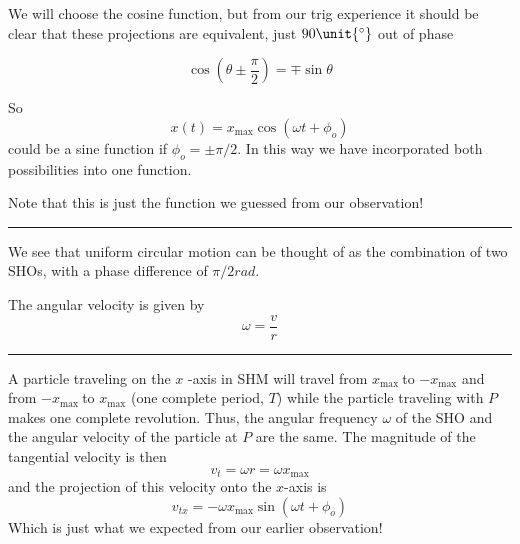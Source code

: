 \documentclass{book}
\begin{document}
We will choose the cosine function, but from our trig experience it should
be clear that these projections are equivalent, just $90\unit{%
{{}^\circ}%
}$ out of phase

\begin{equation*}
\cos \left( \theta \pm \frac{\pi }{2}\right) =\mp \sin \theta
\end{equation*}

So%
\begin{equation*}
x\left( t\right) =x_{\max }\cos \left( \omega t+\phi _{o}\right)
\end{equation*}%
could be a sine function if $\phi _{o}=\pm \pi /2.$ In this way we have
incorporated both possibilities into one function.

Note that this is just the function we guessed from our observation!

\begin{center}
{\small \rule{300pt}{1pt}}

{\small We see that uniform circular motion can be thought of as the
combination of two SHOs, with a phase difference of }$\pi /2\unit{rad}.$

{\small The angular velocity is given by}%
\begin{equation}
\omega =\frac{v}{r}
\end{equation}

{\small \rule{300pt}{1pt}}
\end{center}

A particle traveling on the $x$%
-axis in SHM will travel from $x_{\max }\ $to $-x_{\max }$ and from $%
-x_{\max }\ $to $x_{\max }$ (one complete period, $T$) while the particle
traveling with $P$ makes one complete revolution. Thus, the angular
frequency $\omega $ of the SHO and the angular velocity of the particle at $%
P $ are the same. The magnitude of the tangential velocity is then%
\begin{equation}
v_{t}=\omega r=\omega x_{\max }
\end{equation}%
and the projection of this velocity onto the $x$-axis is 
\begin{equation}
v_{tx}=-\omega x_{\max }\sin \left( \omega t+\phi _{o}\right)
\end{equation}%
Which is just what we expected from our earlier observation!
\end{document}
